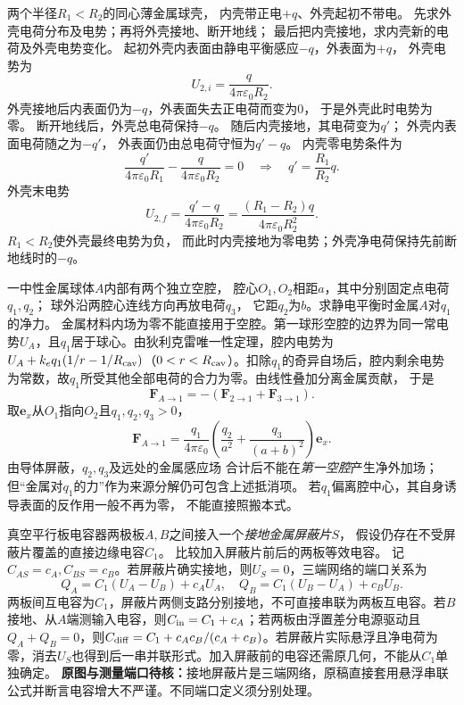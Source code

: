 \problemtext 两个半径$R_1<R_2$的同心薄金属球壳，
内壳带正电$+q$、外壳起初不带电。
先求外壳电荷分布及电势；再将外壳接地、断开地线；
最后把内壳接地，求内壳新的电荷及外壳电势变化。
\workings
起初外壳内表面由静电平衡感应$-q$，外表面为$+q$，
外壳电势为
\[
\boxed{U_{2,i}=\frac{q}{4\pi\varepsilon_0R_2}}.
\]
外壳接地后内表面仍为$-q$，外表面失去正电荷而变为0，
于是外壳此时电势为零。
断开地线后，外壳总电荷保持$-q$。
随后内壳接地，其电荷变为$q'$；
外壳内表面电荷随之为$-q'$，
外表面仍由总电荷守恒为$q'-q$。
内壳零电势条件为
\[
\frac{q'}{4\pi\varepsilon_0R_1}
-\frac{q}{4\pi\varepsilon_0R_2}=0
\quad\Longrightarrow\quad
\boxed{q'=\frac{R_1}{R_2}q}.
\]
外壳末电势
\[
\boxed{U_{2,f}=
\frac{q'-q}{4\pi\varepsilon_0R_2}
=\frac{(R_1-R_2)q}{4\pi\varepsilon_0R_2^2}}.
\]
\crosscheck $R_1<R_2$使外壳最终电势为负，
而此时内壳接地为零电势；外壳净电荷保持先前断地线时的$-q$。

\problemtext 一中性金属球体$A$内部有两个独立空腔，
腔心$O_1,O_2$相距$a$，其中分别固定点电荷$q_1,q_2$；
球外沿两腔心连线方向再放电荷$q_3$，
它距$q_2$为$b$。求静电平衡时金属$A$对$q_1$的净力。
\workings
金属材料内场为零不能直接用于空腔。第一球形空腔的边界为同一常电势$U_A$，且$q_1$居于球心。由狄利克雷唯一性定理，腔内电势为$U_A+k_eq_1(1/r-1/R_{\rm cav})$（$0<r<R_{\rm cav}$）。扣除$q_1$的奇异自场后，腔内剩余电势为常数，故$q_1$所受其他全部电荷的合力为零。由线性叠加分离金属贡献，
于是
\[
\boxed{\bm F_{A\to1}
=-(\bm F_{2\to1}+\bm F_{3\to1})}.
\]
取$\bm e_x$从$O_1$指向$O_2$且$q_1,q_2,q_3>0$，
\[
\boxed{\bm F_{A\to1}
=\frac{q_1}{4\pi\varepsilon_0}
\left(\frac{q_2}{a^2}+
\frac{q_3}{(a+b)^2}\right)\bm e_x}.
\]
\crosscheck 由导体屏蔽，$q_2,q_3$及远处的金属感应场
合计后不能在\emph{第一空腔}产生净外加场；
但“金属对$q_1$的力”作为来源分解仍可包含上述抵消项。
若$q_1$偏离腔中心，其自身诱导表面的反作用一般不再为零，
不能直接照搬本式。

\problemtext 真空平行板电容器两极板$A,B$之间接入一个\emph{接地金属屏蔽片}$S$，
假设仍存在不受屏蔽片覆盖的直接边缘电容$C_1$。
比较加入屏蔽片前后的两板等效电容。
\workings
记$C_{AS}=c_A,C_{BS}=c_B$。若屏蔽片确实接地，则$U_S=0$，三端网络的端口关系为
\[
Q_A=C_1(U_A-U_B)+c_AU_A,\quad Q_B=C_1(U_B-U_A)+c_BU_B.
\]
两板间互电容为$C_1$，屏蔽片两侧支路分别接地，不可直接串联为两板互电容。若$B$接地、从$A$端测输入电容，则$C_{\rm in}=C_1+c_A$；若两板由浮置差分电源驱动且$Q_A+Q_B=0$，则$C_{\rm diff}=C_1+c_Ac_B/(c_A+c_B)$。若屏蔽片实际悬浮且净电荷为零，消去$U_S$也得到后一串并联形式。加入屏蔽前的电容还需原几何，不能从$C_1$单独确定。
\crosscheck \textbf{原图与测量端口待核：}接地屏蔽片是三端网络，原稿直接套用悬浮串联公式并断言电容增大不严谨。不同端口定义须分别处理。

